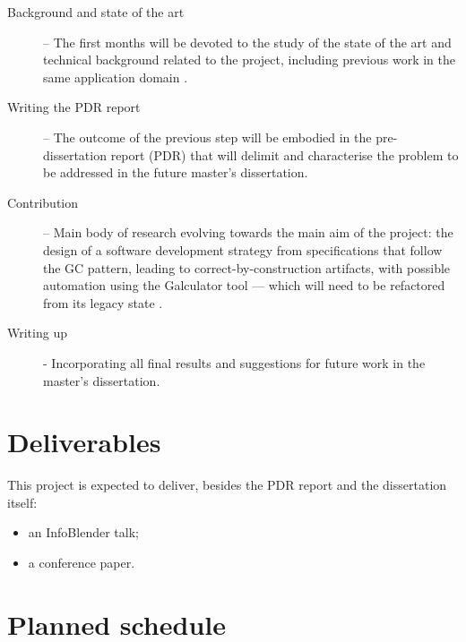 \documentclass[a4paper, 11pt]{article} %
\begin{document}
\begin{description}

\item[Background and state of the art] -- The first months will be devoted
to the study of the state of the art and technical background related to
the project, including previous work in the same application domain \cite{SO08}.

\item[Writing the PDR report] -- The outcome of the previous step will be
embodied in the pre-dissertation report (PDR) that will delimit and characterise
the problem to be addressed in the future master’s dissertation.

\item[Contribution] -- Main body of research evolving towards the main aim of the
project: the design of a software development strategy from specifications 
that follow the GC pattern, leading to correct-by-construction
artifacts, with possible automation using the Galculator tool --- which will need to
be refactored from its legacy state \cite{SO08}.

\item[Writing up] - Incorporating all final results and suggestions for future
work in the master's dissertation.
\end{description}


\section*{Deliverables}

This project is expected to deliver, besides the PDR report and the dissertation itself:
\begin{itemize}
\item   an InfoBlender talk;
\item   a conference paper.
\end{itemize}

\section*{Planned schedule}
\end{document}
